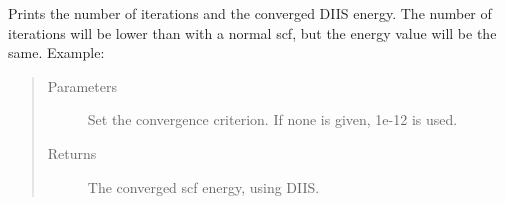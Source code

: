 \documentclass[letterpaper,10pt,english]{sphinxmanual}
\begin{document}
\begin{fulllineitems}
\begin{fulllineitems}
\begin{quote}
\begin{description}
\end{description}\end{quote}

\end{fulllineitems}


\begin{fulllineitems}
\label{\detokenize{RHF:ghf.RHF.RHF.get_scf_solution_diis}}
Prints the number of iterations and the converged DIIS energy. The number of iterations will be lower than with
a normal scf, but the energy value will be the same. Example:

\begin{sphinxVerbatim}[commandchars=\\\{\}]
       
   
\end{sphinxVerbatim}
\begin{quote}\begin{description}
\item[{Parameters}] \leavevmode
{} \textendash{} Set the convergence criterion. If none is given, 1e-12 is used.

\item[{Returns}] \leavevmode
The converged scf energy, using DIIS.

\end{description}\end{quote}

\end{fulllineitems}



\end{fulllineitems}
\end{document}
